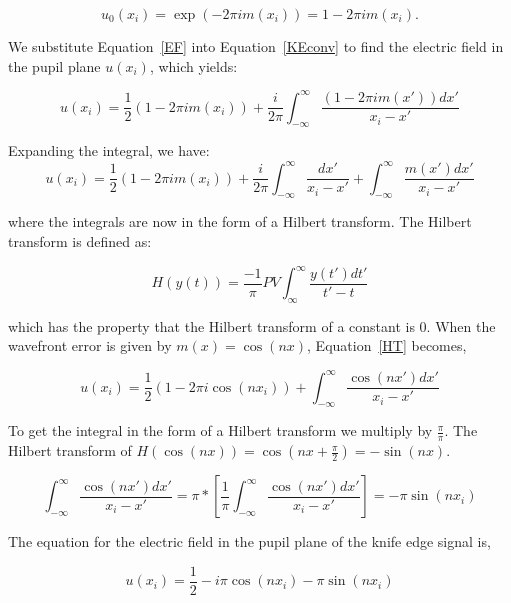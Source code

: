 \begin{equation}
    u_0(x_i )=\exp(-2\pi i m(x_i ))=1-2\pi i m(x_i).
    \label{EF}
\end{equation}

We substitute Equation~\ref{EF} into Equation~\ref{KEconv} to find the electric field in the pupil plane $u(x_i)$, which yields:

\begin{equation}
    u(x_i)= \frac{1}{2}(1-2\pi i m(x_i))+\frac{i}{2\pi}\int_{-\infty}^\infty \frac{(1-2\pi i m(x'))dx'}{x_i-x'}
    \label{HT}
\end{equation}

Expanding the integral, we have:
\begin{equation}
    u(x_i)= \frac{1}{2}(1-2\pi i m(x_i))+\frac{i}{2\pi}\int_{-\infty}^\infty \frac{dx'}{x_i-x'}+\int_{-\infty}^\infty \frac{ m(x')dx'}{x_i-x'}
\end{equation}

where the integrals are now in the form of a Hilbert transform.\cite{villa2014foucault} The Hilbert transform is defined as:

\begin{equation}
    H(y(t))=\frac{-1}{\pi} PV\int_{\infty}^{\infty} \frac{y(t') dt'}{t'-t}
\end{equation}

which has the property that the Hilbert transform of a constant is 0.\cite{poularikas2018handbook} When the wavefront error is given by $m(x)=\cos(nx)$, Equation~\ref{HT} becomes, 


\begin{equation}
    u(x_i)= \frac{1}{2}(1-2\pi i \cos(nx_i))+\int_{-\infty}^\infty \frac{ \cos(nx')dx'}{x_i-x'}
\end{equation}

To get the integral in the form of a Hilbert transform we multiply by $\frac{\pi}{\pi}$. The Hilbert transform of $H(\cos(nx))=\cos(nx+\frac{\pi}{2})=-\sin(nx)$.

\begin{equation}
\int_{-\infty}^\infty \frac{ \cos(nx')dx'}{x_i-x'}=\pi*[\frac{1}{\pi}\int_{-\infty}^\infty \frac{ \cos(nx')dx'}{x_i-x'}]=-\pi \sin(nx_i)
\end{equation}

The equation for the electric field in the pupil plane of the knife edge signal is,

\begin{equation}
   u(x_i)= \frac{1}{2}-i \pi \cos(nx_i) -\pi \sin(nx_i)
   \label{derivationResult}
\end{equation}


